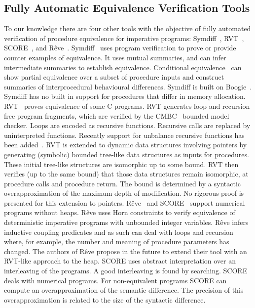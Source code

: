 \documentclass[runningheads,a4paper]{llncs}
\begin{document}
\subsection{Fully Automatic Equivalence Verification Tools}
To our knowledge there are four other tools with the objective of fully automated verification of procedure equivalence for imperative programs: Symdiff~\cite{Lahiri2012}, RVT~\cite{Godlin09}, SCORE~\cite{Partush2014}, and Rêve~\cite{Felsing2014}.
Symdiff~\cite{Lahiri2012} uses program verification to prove or provide counter examples of equivalence. It uses mutual summaries, and can infer intermediate summaries to establish equivalence. Conditional equivalence~\cite{Hawblitzel2013} can show partial equivalence over a subset of procedure inputs and construct summaries of interprocedural behavioural differences. Symdiff is built on Boogie~\cite{Barnett2005}. Symdiff has no built in support for procedures that differ in memory allocation. 
RVT~\cite{Godlin09} proves equivalence of some C programs. RVT generates loop and recursion free program fragments, which are verified by the CMBC~\cite{Clarke2003} bounded model checker. Loops are encoded as recursive functions. Recursive calls are replaced by uninterpreted functions. Recently support for unbalance recursive functions has been added~\cite{Strichman2016}. RVT is extended to dynamic data structures involving pointers by generating (symbolic) bounded tree-like data structures as inputs for procedures. These initial tree-like structures are isomorphic up to some bound. RVT then verifies (up to the same bound) that those data structures remain isomorphic, at procedure calls and procedure return. The bound is determined by a syntactic overapproximation of the maximum depth of modification. No rigorous proof is presented for this extension to pointers.
R{\^e}ve~\cite{Felsing2014} and SCORE~\cite{Partush2014} support numerical programs without heaps. R{\^e}ve uses Horn constraints to verify equivalence of deterministic imperative programs with unbounded integer variables. R{\^e}ve infers inductive coupling predicates and as such can deal with loops and recursion where, for example, the number and meaning of procedure parameters has changed. The authors of R{\^e}ve propose in the future to extend their tool with an RVT-like approach to the heap. SCORE uses abstract interpretation over an interleaving of the programs. A good interleaving is found by searching. SCORE deals with numerical programs. For non-equivalent programs SCORE can compute an overapproximation of the semantic difference. The precision of this overapproximation is related to the size of the syntactic difference.
\end{document}
